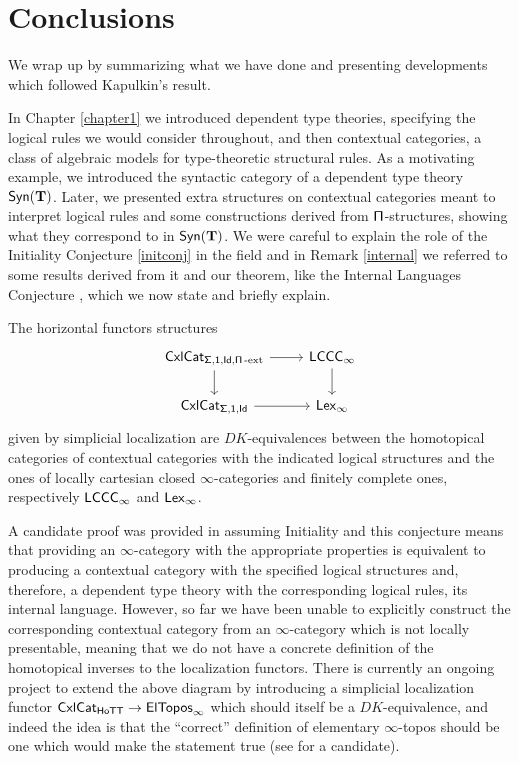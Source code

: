 \section{Conclusions}

We wrap up by summarizing what we have done and presenting developments which
followed Kapulkin's result.

In Chapter \ref{chapter1} we introduced dependent type theories, specifying the
logical rules we would consider throughout, and then contextual categories, a
class of algebraic models for type-theoretic structural rules. As a motivating
example, we introduced the syntactic category of a dependent type theory
$\mathsf{Syn}(\mathbf{T})$. Later, we presented extra structures on contextual categories meant
to interpret logical rules and some constructions derived from
$\operatorname{\mathsf{\Pi}}$-structures, showing what they correspond to in $\mathsf{Syn}(\mathbf{T})$. We were careful
to explain the role of the Initiality Conjecture \ref{initconj} in the field and
in Remark \ref{internal} we referred to some results derived from it and our
theorem, like the Internal Languages Conjecture \cite[Conj.\ 3.7]{KL16}, which
we now state and briefly explain.

\begin{named}\label{intlang}
  The horizontal functors structures
  \[\begin{tikzcd}
    {\Cxl_{\Sigmas,\mathsf{1},\Ids,\Pis\text{-ext}}} & \LCCCi \\
    {\Cxl_{\Sigmas,\mathsf{1},\Ids}} & \Lexi
    \arrow[from=2-1, to=2-2]
    \arrow[from=1-2, to=2-2]
    \arrow[from=1-1, to=2-1]
    \arrow[from=1-1, to=1-2]
  \end{tikzcd}\]
  given by simplicial localization are $DK$-equivalences between the homotopical
  categories of contextual categories with the indicated logical structures and
  the ones of locally cartesian closed $\infty$-categories and finitely complete
  ones, respectively $\operatorname{\mathsf{LCCC}_\infty}$ and $\operatorname{\mathsf{Lex}_\infty}$.
\end{named}

A candidate proof was provided in \cite{NU22} assuming Initiality and this
conjecture means that providing an $\infty$-category with the appropriate
properties is equivalent to producing a contextual category with the specified
logical structures and, therefore, a dependent type theory with the
corresponding logical rules, its internal language.
However, so far we have
been unable to explicitly construct the corresponding contextual category from
an $\infty$-category which is not locally presentable, meaning that we do not
have a concrete definition of the homotopical inverses to the localization
functors.
There is currently an ongoing project to 
extend the above diagram by introducing a simplicial localization
functor $\operatorname{\mathsf{CxlCat}}_{\mathsf{HoTT}}\rightarrow\operatorname{\mathsf{ElTopos}_\infty}$ which should itself be a
$DK$-equivalence, and indeed the idea is that the ``correct'' definition of
elementary $\infty$-topos should be one which would make the statement true (see
\cite{Ras18} for a candidate).

